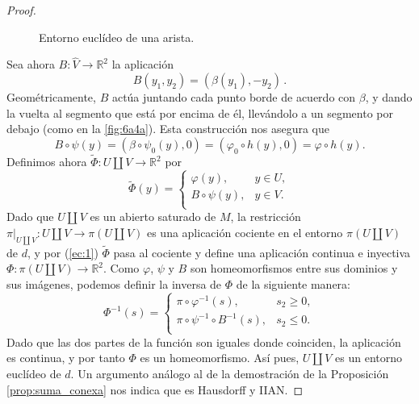 \documentclass[10pt]{report}
\newcommand{\R}{\mathbb{R}}
\theoremstyle{definition}
\begin{document}
\begin{proof}
\begin{figure}
\caption{Entorno euclídeo de una arista. \label{fig:6a4a}}
\end{figure}

Sea ahora $B:\widehat{V}\to \R^2$ la aplicación $$B(y_1,y_2)=\left(\beta (y_1), -y_2\right)\, .$$
Geométricamente, $B$ actúa juntando cada punto borde de acuerdo con $\beta$, y dando la vuelta al segmento que está por encima de él, llevándolo a un segmento por debajo (como en la \autoref{fig:6a4a}). Esta construcción nos asegura que 
\begin{equation}\label{ec:1}
B\circ \psi(y)=\left(\beta \circ \psi_0(y),0\right)=\left(\varphi_0 \circ h(y),0\right)=\varphi \circ h(y).
\end{equation}
Definimos ahora $\tilde{\Phi}:U\amalg V\to \R^2$ por $$\tilde{\Phi}(y)=\begin{cases}
\varphi(y), & y\in U,\\
B\circ \psi (y), & y\in V.\\
\end{cases}$$
Dado que $U\amalg V$ es un abierto saturado de $M$, la restricción $\pi|_{U\amalg V}:U\amalg V\to \pi (U\amalg V)$ es una aplicación cociente en el entorno $\pi (U\amalg V)$ de $d$, y por (\ref{ec:1}) $\tilde{\Phi}$ pasa al cociente y define una aplicación continua e inyectiva $\Phi :\pi (U\amalg V)\to \R^2$. Como $\varphi$, $\psi$ y $B$ son homeomorfismos entre sus dominios y sus imágenes, podemos definir la inversa de $\Phi$ de la siguiente manera:
$$\Phi ^{-1}(s)= \begin{cases} 
\pi \circ \varphi ^{-1}(s), & s_2\geq 0, \\
\pi \circ \psi ^{-1} \circ B^{-1}(s), & s_2\leq 0.\\
 \end{cases}$$
Dado que las dos partes de la función son iguales donde coinciden, la aplicación es continua, y por tanto $\Phi$ es un homeomorfismo. Así pues, $U\amalg V$ es un entorno euclídeo de $d$. Un argumento análogo al de la demostración de la Proposición \ref{prop:suma_conexa} nos indica que es Hausdorff y IIAN.


\end{proof}
\end{document}
